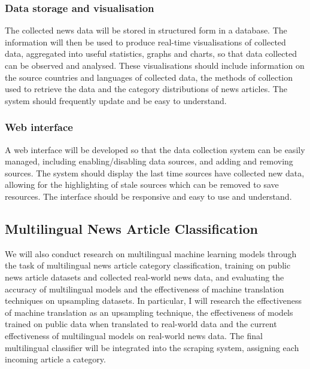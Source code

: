 \documentclass{l4proj}
\begin{document}
\subsubsection{Data storage and visualisation} The collected news data will be stored in structured form in a database. The information will then be used to produce real-time visualisations of collected data, aggregated into useful statistics, graphs and charts, so that data collected can be observed and analysed. These visualisations should include information on the source countries and languages of collected data, the methods of collection used to retrieve the data and the category distributions of news articles. The system should frequently update and be easy to understand.
\subsubsection{Web interface} A web interface will be developed so that the data collection system can be easily managed, including enabling/disabling data sources, and adding and removing sources. The system should display the last time sources have collected new data, allowing for the highlighting of stale sources which can be removed to save resources. The interface should be responsive and easy to use and understand.
\subsection{Multilingual News Article Classification} \hfill \par
We will also conduct research on multilingual machine learning models through the task of multilingual news article category classification, training on public news article datasets and collected real-world news data, and evaluating the accuracy of multilingual models and the effectiveness of machine translation techniques on upsampling datasets. In particular, I will research the effectiveness of machine translation as an upsampling technique, the effectiveness of models trained on public data when translated to real-world data and the current effectiveness of multilingual models on real-world news data. The final multilingual classifier will be integrated into the scraping system, assigning each incoming article a category.
\end{document}
